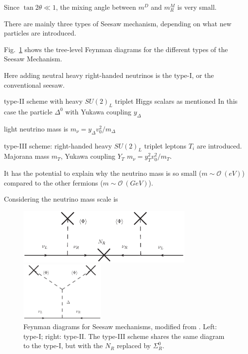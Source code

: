 Since $\tan 2\theta\ll 1$, the mixing angle between $m^D$ and $m^M_R$ is very small. 




There are mainly three types of Seesaw mechanism, depending on what new particles are introduced. 


Fig.~\ref{seesaw} shows the tree-level Feynman diagrams for the different types of the Seesaw Mechanism. 

Here adding neutral heavy right-handed neutrinos is the type-I, or the conventional seesaw\cite{xing2011neutrinos}. 




type-II scheme with heavy $SU(2)_L$ triplet Higgs scalars 
as mentioned
In this case the particle $\Delta^0$ with Yukawa coupling $y_\Delta$ 
 
light neutrino mass is $m_\nu = y_\Delta v^2_0/m_\Delta$


type-III scheme: right-handed heavy $SU(2)_L$ triplet leptons $T_i$ are introduced. Majorana mass $m_T$, Yukawa coupling $Y_T$
$m_\nu = y_T^2 v^2_0/m_T$\cite{barger2012physics}.


It has the potential to explain why the neutrino mass is so small ($m\sim\mathcal{O}~(eV)$) compared to the other fermions ($m\sim\mathcal{O}~(GeV)$).



Considering the neutrino mass scale is 



\begin{figure}[htbp]
	\centering	
	\begin{minipage}[t]{0.6\textwidth}
		\includegraphics[height=2.8cm]{typeIseesaw.eps}
	\end{minipage}
	\begin{minipage}[t]{0.3\textwidth}
		\includegraphics[height=3.0cm]{typeIIseesaw.eps}
	\end{minipage}
	\caption{ Feynman diagrams for Seesaw mechanisms, modified from \cite{valle2015neutrinos}. Left: type-I; right: type-II. The type-III scheme shares the same diagram to the type-I, but with the $N_R$ replaced by $\Sigma_R^0$.}
	\label{seesaw}
\end{figure}







